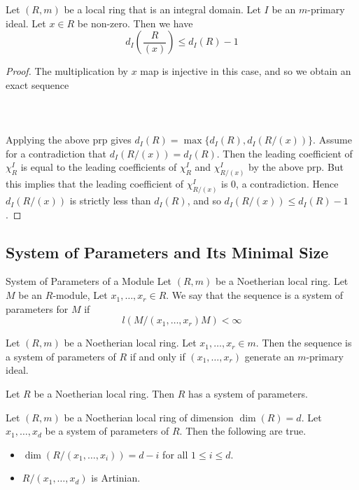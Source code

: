 \documentclass[a4paper]{article}
\begin{document}
\begin{crl}{}{} Let $(R,m)$ be a local ring that is an integral domain. Let $I$ be an $m$-primary ideal. Let $x\in R$ be non-zero. Then we have $$d_I\left(\frac{R}{(x)}\right)\leq d_I(R)-1$$ \tcbline
\begin{proof}
The multiplication by $x$ map is injective in this case, and so we obtain an exact sequence \\~\\
\\~\\
Applying the above prp gives $d_I(R)=\max\{d_I(R),d_I(R/(x))\}$. Assume for a contradiction that $d_I(R/(x))=d_I(R)$. Then the leading coefficient of $\chi_R^I$ is equal to the leading coefficients of $\chi_R^I$ and $\chi_{R/(x)}^I$ by the above prp. But this implies that the leading coefficient of $\chi_{R/(x)}^I$ is $0$, a contradiction. Hence $d_I(R/(x))$ is strictly less than $d_I(R)$, and so $d_I(R/(x))\leq d_I(R)-1$. 
\end{proof}
\end{crl}

\subsection{System of Parameters and Its Minimal Size}
\begin{defn}{System of Parameters of a Module}{} Let $(R,m)$ be a Noetherian local ring. Let $M$ be an $R$-module, Let $x_1,\dots,x_r\in R$. We say that the sequence is a system of parameters for $M$ if $$l(M/(x_1,\dots,x_r)M)<\infty$$
\end{defn}

\begin{lmm}{}{} Let $(R,m)$ be a Noetherian local ring. Let $x_1,\dots,x_r\in m$. Then the sequence is a system of parameters of $R$ if and only if $(x_1,\dots,x_r)$ generate an $m$-primary ideal. 
\end{lmm}

\begin{lmm}{}{} Let $R$ be a Noetherian local ring. Then $R$ has a system of parameters. 
\end{lmm}

\begin{prp}{}{} Let $(R,m)$ be a Noetherian local ring of dimension $\dim(R)=d$. Let $x_1,\dots,x_d$ be a system of parameters of $R$. Then the following are true. 
\begin{itemize}
\item $\dim(R/(x_1,\dots,x_i))=d-i$ for all $1\leq i\leq d$. 
\item $R/(x_1,\dots,x_d)$ is Artinian. 
\end{itemize}
\end{prp}
\end{document}
